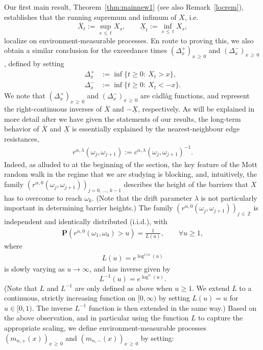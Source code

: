 \documentclass[10pt]{amsart}
\theoremstyle{definition}\newtheorem{defi}[theo]{Definition}\newtheorem{rema}[theo]{Remark}\newtheorem{exam}[theo]{Example}\newtheorem{exem}[theo]{Example}\newtheorem{nota}[theo]{Notation}
\newcommand{\Z}{\mathbb Z}
\newcommand{\bfP}{\mathbf{P}}
\newcommand{\cadlag}{càdlàg }
\let\oldforall\forall
\renewcommand*{\forall}{\mathrel{\oldforall}}
\begin{document}
Our first main result, Theorem~\ref{thm:mainnew1} (see also Remark~\ref{locrem}), establishes that the running supremum and infimum of $X$, i.e.\
\[
\overline{X}_t:=\sup_{s\,\leq\,t}X_s,\qquad \underline{X}_t:=\inf_{s\,\leq\,t}X_s,
\]
localize on environment-measurable processes. En route to proving this, we also obtain a similar conclusion for the exceedance times $(\Delta^+_x)_{x\,\geq\,0}$ and $(\Delta^-_x)_{x\,\geq\,0}$, defined by setting
\begin{align*}
\Delta^+_{x}&:=\inf\{t\geq 0:\: X_t> x\},\\
\Delta^-_{x}&:=\inf\{t\geq 0:\: X_t<-x\}.
\end{align*}
We note that $(\Delta^+_x)_{x\,\geq\,0}$ and $(\Delta^-_{x})_{x\,\geq\,0}$ are \cadlag functions, and represent the right-continuous inverses of $\overline{X}$ and $-\underline{X}$, respectively. As will be explained in more detail after we have given the statements of our results, the long-term behavior of $\overline X $ and $\underline X$ is essentially explained by the nearest-neighbour edge resistances,
\begin{align*}
r^{\alpha,\lambda}(\omega_j,\omega_{j+1}):= c^{\alpha,\lambda}(\omega_j,\omega_{j+1})^{-1}.
\end{align*}
Indeed, as alluded to at the beginning of the section, the key feature of the Mott random walk in the regime that we are studying is blocking, and, intuitively, the family $(r^{\alpha,0}(\omega_{j},\omega_{j+1}))_{j=0,\,\dots,\,k-1}$ describes the height of the barriers that $X$ has to overcome to reach $\omega_k$. (Note that the drift parameter $\lambda$ is not particularly important in determining barrier heights.) The family $(r^{\alpha,0}(\omega_{j},\omega_{j+1}))_{j\,\in\,\Z}$ is independent and identically distributed (i.i.d.), with
\begin{align}\label{eq:slow_varying_tail}
\bfP\left(r^{\alpha,0}(\omega_1,\omega_0)>u\right)=\frac1{L(u)},\qquad \forall u\geq 1,
\end{align}
where
\begin{align}\label{ldef}
L(u)=e^{\log^{1/\alpha}(u)}
\end{align}
is slowly varying as $u\rightarrow\infty$, and has inverse given by
\begin{equation}\label{eq:inverse}
L^{-1}(u)=e^{\log^{\alpha}(u)}.
\end{equation}
(Note that $L$ and $L^{-1}$ are only defined as above when $u\geq 1$. We extend $L$ to a continuous, strictly increasing function on $[0,\infty)$ by setting $L(u)=u$ for $u\in [0,1)$. The inverse $L^{-1}$ function is then extended in the same way.) Based on the above observation, and in particular using the function $L$ to capture the appropriate scaling, we define environment-measurable processes $(m_{n,+}(x))_{x\,\geq\,0}$ and $(m_{n,-}(x))_{x\,\geq\,0}$ by setting:
\end{document}
